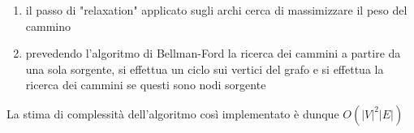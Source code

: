\documentclass[11pt, a4paper, titlepage]{article}
\begin{document}
                \begin{enumerate}
                    \item il passo di "relaxation" applicato sugli archi cerca di massimizzare il peso del cammino
                    \item prevedendo l'algoritmo di Bellman-Ford la ricerca dei cammini a partire da una sola sorgente, si effettua un ciclo sui vertici del grafo e si effettua la ricerca dei cammini se questi sono nodi sorgente
                \end{enumerate}
                La stima di complessità dell'algoritmo così implementato è dunque 
                \begin{math}
                    O(|V|^2 |E|)
                \end{math}
\end{document}
